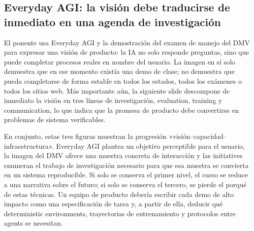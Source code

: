 \subsection{Everyday AGI: la visión debe traducirse de inmediato en una agenda de investigación}

El ponente usa Everyday AGI y la demostración del examen de manejo del DMV para expresar una visión de producto: la IA no solo responde preguntas, sino que puede completar procesos reales en nombre del usuario. La imagen en sí solo demuestra que en ese momento existía una demo de clase; no demuestra que pueda completarse de forma estable en todos los estados, todos los exámenes o todos los sitios web. Más importante aún, la siguiente slide descompone de inmediato la visión en tres líneas de investigación, evaluation, training y communication, lo que indica que la promesa de producto debe convertirse en problemas de sistema verificables.




En conjunto, estas tres figuras muestran la progresión «visión--capacidad--infraestructura». Everyday AGI plantea un objetivo perceptible para el usuario, la imagen del DMV ofrece una muestra concreta de interacción y las initiatives enumeran el trabajo de investigación necesario para que esa muestra se convierta en un sistema reproducible. Si solo se conserva el primer nivel, el curso se reduce a una narrativa sobre el futuro; si solo se conserva el tercero, se pierde el porqué de estas técnicas. Un equipo de producto debería escribir cada demo de alto impacto como una especificación de tarea y, a partir de ella, deducir qué deterministic environments, trayectorias de entrenamiento y protocolos entre agents se necesitan.


